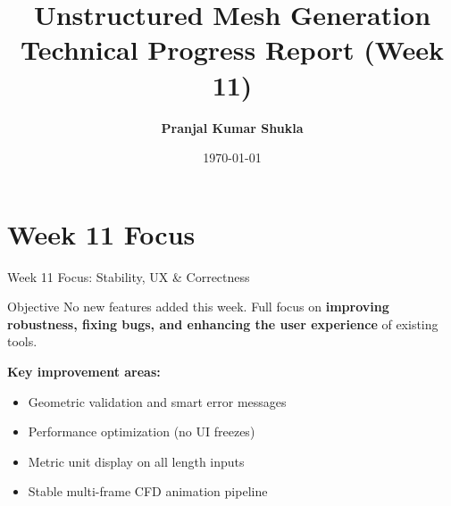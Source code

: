 \documentclass[dvipsnames,mathserif]{beamer}
\begin{document}
\rightskip\rightmargin
\title{\textbf{Unstructured Mesh Generation} \\ Technical Progress Report (Week 11)}
\author{\Large \textbf{Pranjal Kumar Shukla}}
\footnotesize{\date{\today}}


\begin{frame}
\maketitle
\end{frame}

\section{Week 11 Focus}
\begin{frame}{Week 11 Focus: Stability, UX \& Correctness}
    \begin{alertblock}{Objective}
        No new features added this week. Full focus on \textbf{improving robustness, fixing bugs, and enhancing the user experience} of existing tools.
    \end{alertblock}
    \vspace{0.3cm}
    \textbf{Key improvement areas:}
    \begin{itemize}
        \item Geometric validation and smart error messages
        \item Performance optimization (no UI freezes)
        \item Metric unit display on all length inputs
        \item Stable multi-frame CFD animation pipeline
    \end{itemize}
\end{frame}

\end{document}
